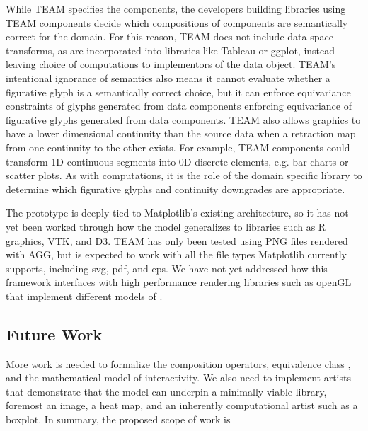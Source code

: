 \documentclass[../main.tex]{subfiles}
\begin{document}
While TEAM specifies the components, the developers building libraries using TEAM components decide which compositions of components are semantically correct for the domain. For this reason, TEAM does not include data space transforms, as are incorporated into libraries like Tableau or ggplot, instead leaving choice of computations to implementors of the data object. TEAM's intentional ignorance of semantics also means it cannot evaluate whether a figurative glyph \cite{byrneAcquiredCodesMeaning2016} is a semantically correct choice, but it can enforce equivariance constraints of glyphs generated from data components enforcing equivariance of figurative glyphs \cite{byrneAcquiredCodesMeaning2016} generated from data components\cite{beckfeathers2014,byrneFigurativeFramesCritical2017}. TEAM also allows graphics to have a lower dimensional continuity than the source data when a retraction map from one continuity to the other exists. For example, TEAM components could transform 1D continuous segments into 0D discrete elements, e.g. bar charts or scatter plots. As with computations, it is the role of the domain specific library to determine which figurative glyphs and continuity downgrades are appropriate. 

The prototype is deeply tied to Matplotlib's existing architecture, so it has not yet been worked through how the model generalizes to libraries such as R graphics\cite{murrellGraphicsThirdEdition2018}, VTK, and D3. TEAM has only been tested using PNG files rendered with AGG\cite{shemanarevAntiGrainGeometry}, but is expected to work with all the file types Matplotlib currently supports, including svg, pdf, and eps. We have not yet addressed how this framework interfaces with high performance rendering libraries such as openGL\cite{CarsonOpenGL1997} that implement different models of \gsection. 

\subsection{Future Work}
More work is needed to formalize the composition operators, equivalence class \vartisteq, and the mathematical model of interactivity. We also need to implement artists that demonstrate that the model can underpin a minimally viable library, foremost an image\cite{haber1990visualization,hansen2011visualization}, a heat map\cite{wilkinsonHistoryClusterHeat2009,loua1873atlas}, and an inherently computational artist such as a boxplot\cite{wickham40YearsBoxplots2011}. In summary, the proposed scope of work is
\end{document}
